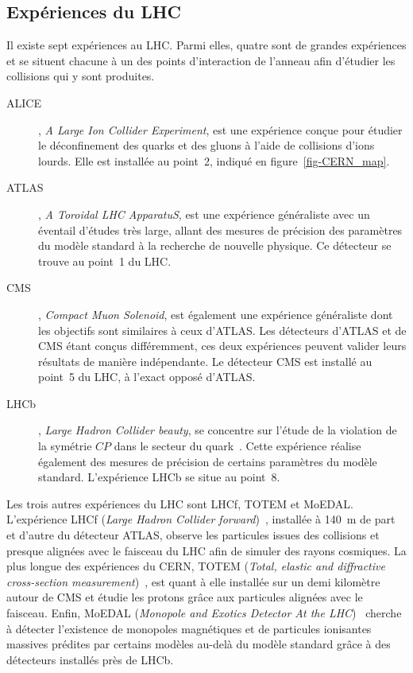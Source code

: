 \subsection{Expériences du LHC}\label{chapter-LHC-section-LHC-subsec-experiments}
Il existe sept expériences au LHC.
Parmi elles, quatre sont de \og grandes expériences \fg{} et se situent chacune à un des points d'interaction de l'anneau afin d'étudier les collisions qui y sont produites.
\begin{description}
\item[ALICE]\cite{alice_paper}, \emph{A Large Ion Collider Experiment}, est une expérience conçue pour étudier le déconfinement des quarks et des gluons à l'aide de collisions d'ions lourds.
Elle est installée au point~2, indiqué en figure~\ref{fig-CERN_map}.%
\item[ATLAS]\cite{atlas_paper}, \emph{A Toroidal LHC ApparatuS}, est une expérience généraliste avec un éventail d'études très large, allant des mesures de précision des paramètres du modèle standard à la recherche de nouvelle physique. Ce détecteur se trouve au point~1 du LHC.
\item[CMS]\cite{cms_paper}, \emph{Compact Muon Solenoid}, est également une expérience généraliste dont les objectifs sont similaires à ceux d'ATLAS. Les détecteurs d'ATLAS et de CMS étant conçus différemment, ces deux expériences peuvent valider leurs résultats de manière indépendante. Le détecteur CMS est installé au point~5 du LHC, à l'exact opposé d'ATLAS.
\item[LHCb]\cite{lhcb_paper}, \emph{Large Hadron Collider beauty}, se concentre sur l'étude de la violation de la symétrie $CP$ dans le secteur du quark~\quarkb. Cette expérience réalise également des mesures de précision de certains paramètres du modèle standard. L'expérience LHCb se situe au point~8.
\end{description}
\par Les trois autres expériences du LHC sont LHCf, TOTEM et MoEDAL.
L'expérience LHCf (\emph{Large Hadron Collider forward})~\cite{lhcf_paper}, installée à \SI{140}{\meter} de part et d'autre du détecteur ATLAS, observe les particules issues des collisions et presque alignées avec le faisceau du LHC afin de simuler des rayons cosmiques.
La plus \og longue \fg{} des expériences du CERN, TOTEM (\emph{Total, elastic and diffractive cross-section measurement})~\cite{totem_paper}, est quant à elle installée sur un demi kilomètre autour de CMS et étudie les protons grâce aux particules alignées avec le faisceau.
Enfin, MoEDAL (\emph{Monopole and Exotics Detector At the LHC})~\cite{moedal_paper} cherche à détecter l'existence de monopoles magnétiques et de particules ionisantes massives prédites par certains modèles au-delà du modèle standard grâce à des détecteurs installés près de LHCb.